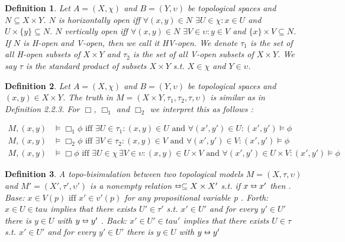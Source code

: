 \documentclass[12pt, a4paper]{scrartcl}
\newtheorem{definition}{Definition}[subsection]
\begin{document}
\begin{definition}
    Let $A = (X, \chi)$ and $B =(Y, \upsilon)$ be topological spaces and $N \subseteq X \times Y $. \newline \newline
    $N$ is horizontally open iff  $\forall (x,y) \in N $ $\exists U \in \chi : x \in U $ and $ U \times \{ y \} \subseteq N$. \newline
    $N$ vertically open iff $\forall (x,y) \in N$ $\exists V \in \upsilon : y \in V$ and  $ \{ x \} \times V \subseteq N$. \newline \newline
    If $N$ is H-open and V-open, then we call it HV-open. \newline
    We denote $\tau_1$ is the set of all H-open subsets of $X \times Y$ and $\tau_2$ is the set of all V-open subsets of $X\times Y$. We say $\tau$ is the standard product of subsets $X \times Y$ s.t. $X \in \chi$ and $Y \in \upsilon$.
        
\end{definition}

\begin{definition}
    Let $A = (X, \chi)$ and $B =(Y, \upsilon)$ be topological spaces and $(x,y) \in X \times Y$. The truth in $M = (X\times Y, \tau_1,\tau_2,\tau, \upsilon)$ is similar as in Definition 2.2.3.
    For $\Box$, $\Box_1$ and $\Box_2$ we interpret this as follows : 
    
    \begin{align*}
        M,(x,y) &\vDash \Box_1 \phi \mbox{ iff } \exists U \in \tau_1 : (x,y) \in U \mbox{ and } \forall(x',y') \in U : (x',y') \vDash \phi \\
        M,(x,y) &\vDash \Box_2 \phi \mbox{ iff } \exists V \in \tau_2 : (x,y) \in V \mbox{ and } \forall(x',y') \in V : (x',y') \vDash \phi \\
        M,(x,y) &\vDash \Box \phi \mbox{ iff } \exists U \in \chi \, \exists V \in \upsilon: (x,y) \in U \times V \mbox{ and } \forall(x',y') \in U \times V : (x',y') \vDash \phi
    \end{align*}

\end{definition}

\begin{definition}
    A topo-bisimulation between two topological models $M = (X,\tau, \upsilon)$ and $M' = (X', \tau', \upsilon')$ is a nonempty relation $\leftrightarroweq \subseteq X \times X'$ s.t. if $x \leftrightarroweq x'$ then \newline 
    . Base: $x \in V(p) \mbox{ iff } x' \in v'(p)$ for any propositional variable p . Forth: $x \in U \in tau$ implies that there exists $U' \in \tau'$ s.t. $x' \in U'$ and for every $y' \in U'$ there is $y \in U$ with $y \leftrightarroweq y'$ . Back: $x' \in U' \in tau'$ implies that there exists $U \in \tau$ s.t. $x' \in U'$ and for every $y' \in U'$ there is $y \in U$ with $y \leftrightarroweq y'$

\end{definition}
\end{document}
